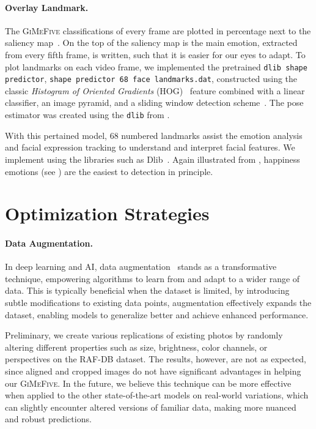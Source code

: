 \paragraph{Overlay Landmark.}
The \textsc{GiMeFive} classifications of every frame are plotted in percentage next to the saliency map~\cite{SimonyanVZ13}.
On the top of the saliency map is the main emotion, extracted from every fifth frame, is written, 
such that it is easier for our eyes to adapt. 
To plot landmarks on each video frame, 
we implemented the pretrained \texttt{dlib shape predictor}, \texttt{shape predictor 68 face landmarks.dat}, 
constructed using the classic \textit{Histogram of Oriented Gradients} (HOG)~\cite{1467360} feature combined with a linear classifier, 
an image pyramid, and a sliding window detection scheme~\cite{dlib_site}. 
The pose estimator was created using the \texttt{dlib} from \citet{6909637}.

With this pertained model, 
68 numbered landmarks assist the emotion analysis and facial expression tracking to understand and interpret facial features.
We implement using the libraries such as Dlib~\cite{dlib_site}. 
Again illustrated from , 
happiness emotions (see ) are the easiest to detection in principle. 

\section{Optimization Strategies}
\label{sec:optim}

\paragraph{Data Augmentation.}
In deep learning and AI, 
data augmentation~\cite{augment} stands as a transformative technique, 
empowering algorithms to learn from and adapt to a wider range of data. 
This is typically beneficial when the dataset is limited, 
by introducing subtle modifications to existing data points, 
augmentation effectively expands the dataset, 
enabling models to generalize better and achieve enhanced performance. 

Preliminary, 
we create various replications of existing photos by randomly altering different properties such as size, 
brightness, color channels, or perspectives on the RAF-DB dataset. 
The results, however, are not as expected, 
since aligned and cropped images do not have significant advantages in helping our \textsc{GiMeFive}. 
In the future, 
we believe this technique can be more effective when applied to the other state-of-the-art models on real-world variations, 
which can slightly encounter altered versions of familiar data, 
making more nuanced and robust predictions. 

